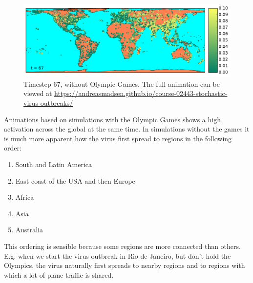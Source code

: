 \begin{figure}[H]
	\centering
	\includegraphics[width=1.0 \linewidth]{plots/gifs/frames/noRio-67}
	\caption{Timestep 67, without Olympic Games. The full animation can be viewed at
		\url{https://andreasmadsen.github.io/course-02443-stochastic-virus-outbreaks/}}
	\label{fig:noRio-67}
\end{figure}

Animations based on simulations with the Olympic Games shows a high activation across the global at the same time. In simulations without the games it is much more apparent how the virus first spread to regions in the following order:
\begin{enumerate}
	\item South and Latin America
	\item East coast of the USA and then Europe
	\item Africa
	\item Asia
	\item Australia
\end{enumerate}

This ordering is sensible because some regions are more connected than others. E.g. when we start the virus outbreak in Rio de Janeiro, but don't hold the Olympics, the virus naturally first spreads to nearby regions and to regions with which a lot of plane traffic is shared.
